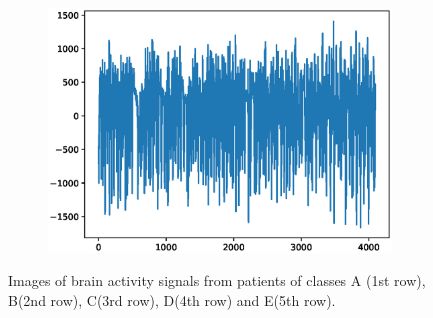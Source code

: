 \documentclass[12pt]{article}
\begin{document}
\begin{figure}
\begin{subfigure}{.25\textwidth}
\end{subfigure}%
\begin{subfigure}{.25\textwidth}
  \centering
  \includegraphics[width=.8\linewidth]{figures/signals/E/S035.eps}
\end{subfigure}
\caption{Images of brain activity signals from patients of classes A (1st row), B(2nd row), C(3rd row), D(4th row) and E(5th row).}
\label{fig:signals}
\end{figure}
\end{document}
